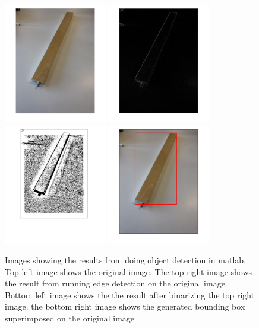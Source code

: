\begin{figure}[hbtp]
\begin{center}
\includegraphics[width = 0.4\textwidth]{./Images/matlabImage1.png}
\includegraphics[width = 0.4\textwidth]{./Images/matlabImage2.png}
\includegraphics[width = 0.4\textwidth]{./Images/matlabImage3.png} 
\includegraphics[width = 0.4\textwidth]{./Images/matlabImage4.png} 
\caption{Images showing the results from doing object detection in matlab. Top left image shows the original image. The top right image shows the result from running edge detection on the original image. Bottom left image shows the the result after  binarizing the top right image. the bottom right image shows the generated bounding box superimposed on the original image}
\label{fig:matlabImages}
\end{center}
\end{figure}

